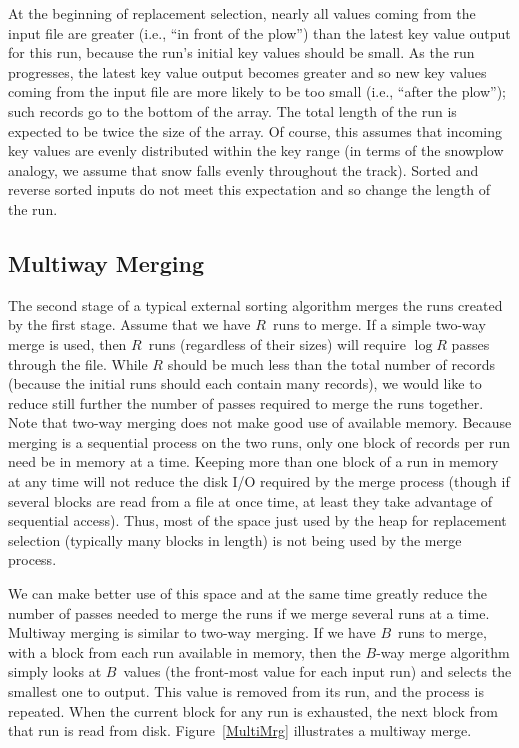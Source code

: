 At the beginning of replacement selection, nearly all values coming
from the input file are greater (i.e., ``in front of the plow'')
than the latest key value output for
this run, because the run's initial key values should be small.
As the run progresses, the latest key value output becomes greater and
so new key values coming from the input file are more likely to be too
small (i.e., ``after the plow''); such records go to the bottom of
the array.
The total length of the run is expected to be twice the size of the
array.
Of course, this assumes that incoming key values are evenly distributed
within the key range (in terms of the snowplow analogy, we assume that
snow falls evenly throughout the track).
Sorted and reverse sorted inputs do not meet this expectation and so
change the length of the run.

\subsection{Multiway Merging}
\label{MultiMerge}

The
second stage of a typical external sorting algorithm merges the
runs created by the first stage.
Assume that we have \(R\)~runs to merge.
If a simple two-way merge is used, then \(R\)~runs (regardless of their
sizes) will require \(\log R\) passes through the file.
While \(R\) should be much less than the total number of records
(because the initial runs should each contain many records),
we would like to reduce still further the number of passes required
to merge the runs together.
Note that two-way merging does not make good use of available memory.
Because merging is a sequential process on the two runs, only one block
of records per run need be in memory at a time.
Keeping more than one block of a run in memory at any time will
not reduce the disk I/O required by the merge process
(though if several blocks are read from a file at once time,
at least they take advantage of sequential access).
Thus, most of the space just used by the heap for replacement
selection (typically many blocks in length) is not being used by the
merge process.

We can make better use of this space and at the same time greatly
reduce the number of passes needed to merge the runs if we merge
several runs at a time.
Multiway merging is similar to two-way merging.
If we have \(B\)~runs to merge, with a block from each run available in
memory, then the \(B\)-way merge algorithm simply looks at
\(B\)~values (the front-most value for each input run) and selects the
smallest one to output.
This value is removed from its run, and the process is repeated.
When the current block for any run is exhausted, the next block from
that run is read from disk.
Figure~\ref{MultiMrg} illustrates a multiway merge.

